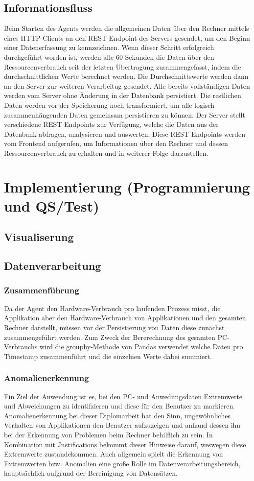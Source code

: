 \documentclass{report}
\begin{document}
\section{Informationsfluss}
Beim Starten des Agents werden die allgemeinen Daten über den Rechner mittels eines HTTP Clients an den REST Endpoint des Servers gesendet, um den Beginn einer Datenerfassung zu kennzeichnen. Wenn dieser Schritt erfolgreich durchgeführt worden ist, werden alle 60 Sekunden die Daten über den Ressourcenverbrauch seit der letzten Übertragung zusammengefasst, indem die durchschnittlichen Werte berechnet werden. Die Durchschnittswerte werden dann an den Server zur weiteren Verarbeitug gesendet.
Alle bereits vollständigen Daten werden vom Server ohne Änderung in der Datenbank persistiert. Die restlichen Daten werden vor der Speicherung noch transformiert, um alle logisch zusammenhängenden Daten gemeinsam persistieren zu können.
Der Server stellt verschiedene REST Endpoints zur Verfügung, welche die Daten aus der Datenbank abfragen, analysieren und auswerten.
Diese REST Endpoints werden vom Frontend aufgerufen, um Informationen über den Rechner und dessen Ressourcenverbrauch zu erhalten und in weiterer Folge darzustellen.

\chapter{Implementierung (Programmierung und QS/Test)}
\section{Visualiserung}
\section{Datenverarbeitung}
\subsection{Zusammenführung}
Da der Agent den Hardware-Verbrauch pro laufenden Prozess misst, die Applikation aber den Hardware-Verbrauch von Applikationen und den gesamten Rechner darstellt, müssen vor der Persistierung von Daten diese zunächst zusammengeführt werden. Zum Zweck der Bererechnung des gesamten PC-Verbrauchs wird die groupby-Methode von Pandas verwendet welche Daten pro Timestamp zusammenführt und die einzelnen Werte dabei summiert.
\subsection{Anomalienerkennung}
Ein Ziel der Anwendung ist es, bei den PC- und Anwedungsdaten Extremwerte und Abweichungen zu identifzieren und diese für den Benutzer zu markieren. Anomalienerkennung bei dieser Diplomarbeit hat den Sinn, ungewöhnliches Verhalten von Applikationen den Benutzer aufzuzeigen und anhand dessen ihn bei der Erkennung von Problemen beim Rechner behilflich zu sein. In Kombination mit Justifications bekommt dieser Hinweise darauf, weswegen diese Extremwerte zustandekommen. Auch allgemein spielt die Erkennung von Extremwerten bzw. Anomalien eine große Rolle im Datenverarbeitungsbereich, hauptsächlich aufgrund der Bereinigung von Datensätzen.
\end{document}

